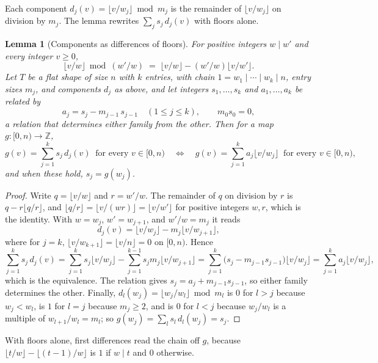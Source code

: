\documentclass[11pt]{article}
\newtheorem{lemma}{Lemma}
\theoremstyle{definition}
\newcommand{\Z}{\mathbb{Z}}
\begin{document}
Each component $d_j(v) = \lfloor v/w_j \rfloor \bmod m_j$ is the remainder
of $\lfloor v/w_j \rfloor$ on division by $m_j$. The lemma rewrites
$\sum_j s_j\, d_j(v)$ with floors alone.

\begin{lemma}[Components as differences of floors]\label{lem:floor}
For positive integers $w \mid w'$ and every integer $v \ge 0$,
\[
\lfloor v/w \rfloor \bmod (w'/w) \;=\;
\lfloor v/w \rfloor - (w'/w)\lfloor v/w' \rfloor .
\]
Let $T$ be a flat shape of size $n$ with $k$ entries, with chain
$1 = w_1 \mid \cdots \mid w_k \mid n$, entry sizes $m_j$, and components
$d_j$ as above, and let integers $s_1,\dots,s_k$ and $a_1,\dots,a_k$ be
related by
\[
a_j = s_j - m_{j-1}\,s_{j-1} \quad (1 \le j \le k), \qquad m_0 s_0 = 0,
\]
a relation that determines either family from the other. Then for a map
$g : [0,n) \to \Z$,
\[
g(v) = \sum_{j=1}^{k} s_j\, d_j(v) \ \text{ for every } v \in [0,n)
\quad\Longleftrightarrow\quad
g(v) = \sum_{j=1}^{k} a_j \lfloor v/w_j \rfloor \ \text{ for every } v \in [0,n),
\]
and when these hold, $s_j = g(w_j)$.
\end{lemma}
\begin{proof}
Write $q = \lfloor v/w \rfloor$ and $r = w'/w$. The remainder of $q$ on
division by $r$ is $q - r\lfloor q/r \rfloor$, and $\lfloor q/r \rfloor =
\lfloor v/(wr) \rfloor = \lfloor v/w' \rfloor$ for positive integers $w, r$,
which is the identity. With $w = w_j$, $w' = w_{j+1}$, and $w'/w = m_j$ it
reads
\[
d_j(v) = \lfloor v/w_j \rfloor - m_j \lfloor v/w_{j+1} \rfloor,
\]
where for $j = k$, $\lfloor v/w_{k+1} \rfloor = \lfloor v/n \rfloor = 0$ on
$[0,n)$. Hence
\[
\sum_{j=1}^{k} s_j\, d_j(v)
= \sum_{j=1}^{k} s_j \lfloor v/w_j \rfloor
  - \sum_{j=1}^{k-1} s_j m_j \lfloor v/w_{j+1} \rfloor
= \sum_{j=1}^{k} \big(s_j - m_{j-1}s_{j-1}\big) \lfloor v/w_j \rfloor
= \sum_{j=1}^{k} a_j \lfloor v/w_j \rfloor ,
\]
which is the equivalence. The relation gives $s_j = a_j + m_{j-1}s_{j-1}$,
so either family determines the other. Finally,
$d_l(w_j) = \lfloor w_j/w_l \rfloor \bmod m_l$ is $0$ for $l > j$ because
$w_j < w_l$, is $1$ for $l = j$ because $m_j \ge 2$, and is $0$ for $l < j$
because $w_j/w_l$ is a multiple of $w_{l+1}/w_l = m_l$; so
$g(w_j) = \sum_l s_l\, d_l(w_j) = s_j$.
\end{proof}

With floors alone, first differences read the chain off $g$, because
$\lfloor t/w \rfloor - \lfloor (t-1)/w \rfloor$ is $1$ if $w \mid t$ and $0$
otherwise.
\end{document}

